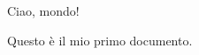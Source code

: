 \documentclass{article}
\begin{document}
Ciao, mondo!

Questo è il mio primo documento.
\end{document}
